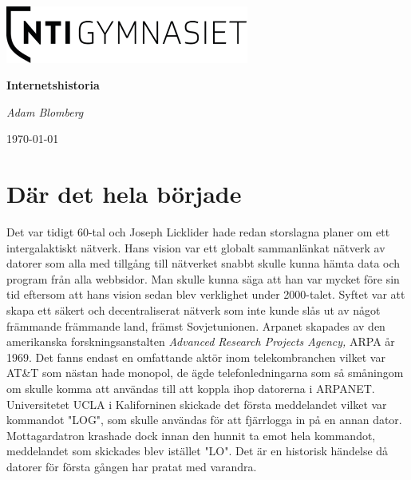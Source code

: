 \documentclass[a4paper,11pt]{article}
\begin{document}
\begin{titlepage}
	\centering
	\includegraphics[width=0.6\textwidth]{Bilder/logo.png}\par\vspace{1cm}
	\vspace{1.5cm}
	{\huge\bfseries Internetshistoria\par}
	\vspace{2cm}
	{\Large\itshape Adam Blomberg\par}
	\vfill
{}
	\vfill

	{\large \today\par}
\end{titlepage}

\tableofcontents
\newpage

\section{Där det hela började}

Det var tidigt 60-tal och Joseph Licklider hade redan storslagna planer om ett intergalaktiskt nätverk. Hans vision var ett globalt sammanlänkat nätverk av datorer som alla med tillgång till nätverket snabbt skulle kunna hämta data och program från alla webbsidor. Man skulle kunna säga att han var mycket före sin tid eftersom att hans vision sedan blev verklighet under 2000-talet. Syftet var att skapa ett säkert och decentraliserat nätverk som inte kunde slås ut av något främmande främmande land, främst Sovjetunionen. Arpanet skapades av den amerikanska forskningsanstalten \textit{Advanced Research Projects Agency,} ARPA år 1969. Det fanns endast en omfattande aktör inom  telekombranchen vilket var AT\&T som nästan hade monopol, de ägde telefonledningarna som så småningom om skulle komma att användas till att koppla ihop datorerna i ARPANET. Universitetet UCLA i Kaliforninen skickade det första meddelandet vilket var kommandot "LOG", som skulle användas för att fjärrlogga in på en annan dator. Mottagardatron krashade dock innan den hunnit ta emot hela kommandot, meddelandet som skickades blev istället "LO". Det är en historisk händelse då datorer för första gången har pratat med varandra.
\end{document}
